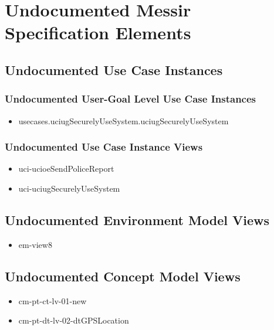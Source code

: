 	
\chapter{Undocumented Messir Specification Elements}





\section[Undocumented Use Case Instances]{Undocumented Use Case Instances}


\subsection[Undocumented Use Case Instances - User-Goal Level]{Undocumented User-Goal Level Use Case Instances}
\begin{itemize}
\item usecases.uciugSecurelyUseSystem.uciugSecurelyUseSystem 
\end{itemize}


\subsection[Undocumented Use Case Instance Views]{Undocumented Use Case Instance Views}
\begin{itemize}
\item uci-ucioeSendPoliceReport 
\item uci-uciugSecurelyUseSystem 
\end{itemize}




\section[Undocumented Environment Model Views]{Undocumented Environment Model Views}
\begin{itemize}
\item em-view8 
\end{itemize}












\section[Undocumented Concept Model Views]{Undocumented Concept Model Views}
\begin{itemize}
\item cm-pt-ct-lv-01-new 
\item cm-pt-dt-lv-02-dtGPSLocation 
\end{itemize}







